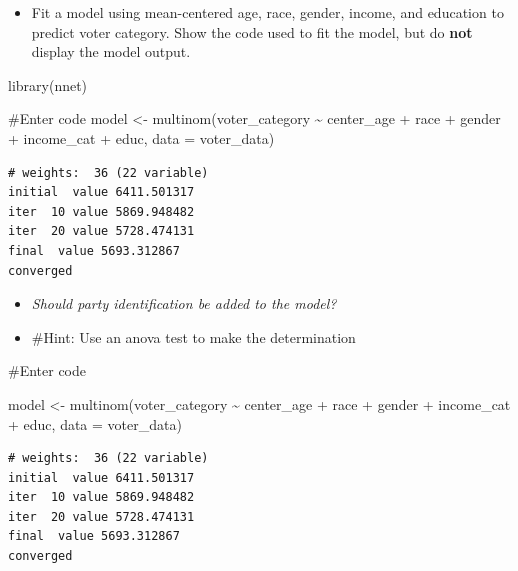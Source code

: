 \documentclass[
  letterpaper,
  DIV=11,
  numbers=noendperiod]{scrartcl}
\newenvironment{Shaded}{\begin{snugshade}}{\end{snugshade}}
\newcommand{\AttributeTok}[1]{\textcolor[rgb]{0.40,0.45,0.13}{#1}}
\newcommand{\CommentTok}[1]{\textcolor[rgb]{0.37,0.37,0.37}{#1}}
\newcommand{\FunctionTok}[1]{\textcolor[rgb]{0.28,0.35,0.67}{#1}}
\newcommand{\NormalTok}[1]{\textcolor[rgb]{0.00,0.23,0.31}{#1}}
\newcommand{\OtherTok}[1]{\textcolor[rgb]{0.00,0.23,0.31}{#1}}
\newcommand{\SpecialCharTok}[1]{\textcolor[rgb]{0.37,0.37,0.37}{#1}}
\providecommand{\tightlist}{%
  \setlength{\itemsep}{0pt}\setlength{\parskip}{0pt}}\usepackage{longtable,booktabs,array}
\begin{document}
\begin{itemize}
\tightlist
\item
  Fit a model using mean-centered age, race, gender, income, and
  education to predict voter category. Show the code used to fit the
  model, but do \textbf{not} display the model output.
\end{itemize}

\begin{Shaded}
\begin{Highlighting}[]
    \FunctionTok{library}\NormalTok{(nnet)}
    
    \CommentTok{\#Enter code}
\NormalTok{model }\OtherTok{\textless{}{-}} \FunctionTok{multinom}\NormalTok{(voter\_category }\SpecialCharTok{\textasciitilde{}}\NormalTok{ center\_age }\SpecialCharTok{+}\NormalTok{ race }\SpecialCharTok{+}\NormalTok{ gender }\SpecialCharTok{+}\NormalTok{ income\_cat }\SpecialCharTok{+}\NormalTok{ educ, }\AttributeTok{data =}\NormalTok{ voter\_data)}
\end{Highlighting}
\end{Shaded}

\begin{verbatim}
# weights:  36 (22 variable)
initial  value 6411.501317 
iter  10 value 5869.948482
iter  20 value 5728.474131
final  value 5693.312867 
converged
\end{verbatim}

\begin{itemize}
\tightlist
\item
  \emph{Should party identification be added to the model?}
\item
  \#Hint: Use an anova test to make the determination
\end{itemize}

\begin{Shaded}
\begin{Highlighting}[]
\CommentTok{\#Enter code}

\NormalTok{model }\OtherTok{\textless{}{-}} \FunctionTok{multinom}\NormalTok{(voter\_category }\SpecialCharTok{\textasciitilde{}}\NormalTok{ center\_age }\SpecialCharTok{+}\NormalTok{ race }\SpecialCharTok{+}\NormalTok{ gender }\SpecialCharTok{+}\NormalTok{ income\_cat }\SpecialCharTok{+}\NormalTok{ educ, }\AttributeTok{data =}\NormalTok{ voter\_data)}
\end{Highlighting}
\end{Shaded}

\begin{verbatim}
# weights:  36 (22 variable)
initial  value 6411.501317 
iter  10 value 5869.948482
iter  20 value 5728.474131
final  value 5693.312867 
converged
\end{verbatim}
\end{document}
